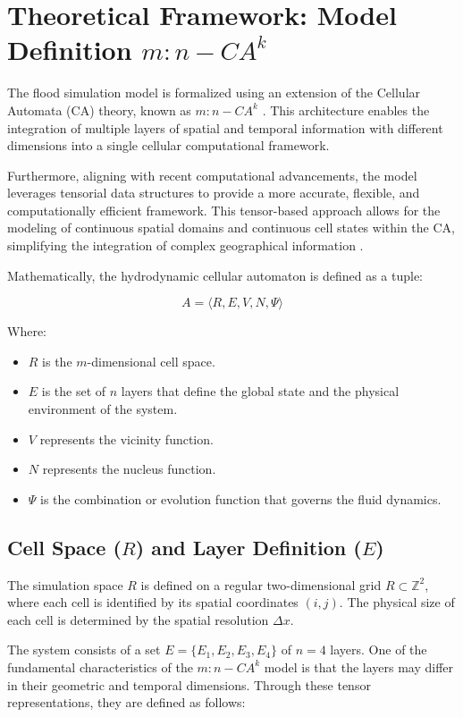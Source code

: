 
\section{Theoretical Framework: Model Definition $m:n-CA^k$}

The flood simulation model is formalized using an extension of the Cellular Automata (CA) theory, known as $m:n-CA^k$ 
\parencite{Fonseca2011}. This architecture enables the integration of multiple layers of spatial and 
temporal information with different dimensions into a single cellular computational framework.

Furthermore, aligning with recent computational advancements, the model leverages tensorial data structures to provide a 
more accurate, flexible, and computationally efficient framework. This tensor-based approach allows for the 
modeling of continuous spatial domains and continuous cell states within the CA, simplifying the integration of complex 
geographical information \parencite{Fonseca2025}. 

Mathematically, the hydrodynamic cellular automaton is defined as a tuple:

$$A = \langle R, E, V, N, \Psi \rangle$$

Where:

\begin{itemize}
    \item $R$ is the $m$-dimensional cell space.
    \item $E$ is the set of $n$ layers that define the global state and the physical environment of the system.
    \item $V$ represents the vicinity function.
    \item $N$ represents the nucleus function.
    \item $\Psi$ is the combination or evolution function that governs the fluid dynamics.
\end{itemize}


\subsection{Cell Space ($R$) and Layer Definition ($E$)}

The simulation space $R$ is defined on a regular two-dimensional grid $R \subset \mathbb{Z}^2$, where each cell is 
identified by its spatial coordinates $(i, j)$. The physical size of each cell is determined by the spatial resolution 
$\Delta x$.

The system consists of a set $E = \{E_1, E_2, E_3, E_4\}$ of $n=4$ layers. One of the fundamental characteristics of the 
$m:n-CA^k$ model is that the layers may differ in their geometric and temporal dimensions. Through these tensor representations, 
they are defined as follows:

